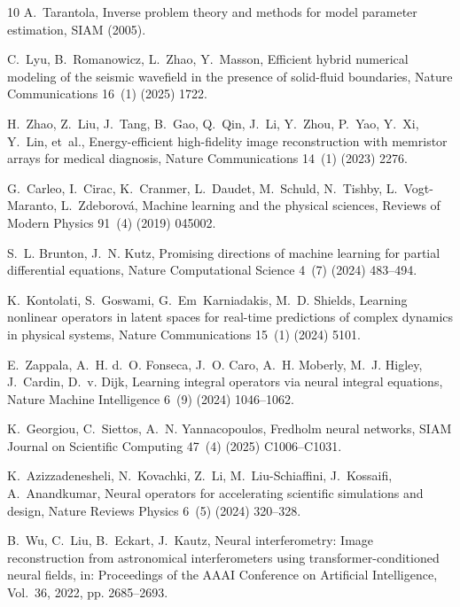 \documentclass[preprint,numbers,sort&compress]{elsarticle}
\begin{document}
\begin{thebibliography}{10}
				A.~Tarantola, Inverse problem theory and methods for model parameter
				estimation, SIAM (2005).
				
				C.~Lyu, B.~Romanowicz, L.~Zhao, Y.~Masson, Efficient hybrid numerical modeling
				of the seismic wavefield in the presence of solid-fluid boundaries, Nature
				Communications 16~(1) (2025) 1722.
				
				H.~Zhao, Z.~Liu, J.~Tang, B.~Gao, Q.~Qin, J.~Li, Y.~Zhou, P.~Yao, Y.~Xi,
				Y.~Lin, et~al., Energy-efficient high-fidelity image reconstruction with
				memristor arrays for medical diagnosis, Nature Communications 14~(1) (2023)
				2276.
				
				G.~Carleo, I.~Cirac, K.~Cranmer, L.~Daudet, M.~Schuld, N.~Tishby,
				L.~Vogt-Maranto, L.~Zdeborov{\'a}, Machine learning and the physical
				sciences, Reviews of Modern Physics 91~(4) (2019) 045002.
				
				S.~L. Brunton, J.~N. Kutz, Promising directions of machine learning for partial
				differential equations, Nature Computational Science 4~(7) (2024) 483--494.
				
				K.~Kontolati, S.~Goswami, G.~Em~Karniadakis, M.~D. Shields, Learning nonlinear
				operators in latent spaces for real-time predictions of complex dynamics in
				physical systems, Nature Communications 15~(1) (2024) 5101.
				
				E.~Zappala, A.~H. d.~O. Fonseca, J.~O. Caro, A.~H. Moberly, M.~J. Higley,
				J.~Cardin, D.~v. Dijk, Learning integral operators via neural integral
				equations, Nature Machine Intelligence 6~(9) (2024) 1046--1062.
				
				K.~Georgiou, C.~Siettos, A.~N. Yannacopoulos, Fredholm neural networks, SIAM
				Journal on Scientific Computing 47~(4) (2025) C1006--C1031.
				
				K.~Azizzadenesheli, N.~Kovachki, Z.~Li, M.~Liu-Schiaffini, J.~Kossaifi,
				A.~Anandkumar, Neural operators for accelerating scientific simulations and
				design, Nature Reviews Physics 6~(5) (2024) 320--328.
				
				B.~Wu, C.~Liu, B.~Eckart, J.~Kautz, Neural interferometry: Image reconstruction
				from astronomical interferometers using transformer-conditioned neural
				fields, in: Proceedings of the AAAI Conference on Artificial Intelligence,
				Vol.~36, 2022, pp. 2685--2693.
				

\end{thebibliography}
\end{document}
